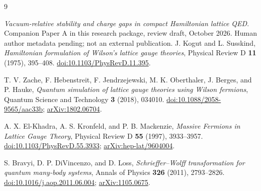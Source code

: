 
\begin{thebibliography}{9}
\raggedright
{}
\emph{Vacuum-relative stability and charge gaps in compact Hamiltonian lattice QED}.
Companion Paper A in this research package, review draft, October 2026.
Human author metadata pending; not an external publication.
J. Kogut and L. Susskind,
\emph{Hamiltonian formulation of Wilson's lattice gauge theories},
Physical Review D \textbf{11} (1975), 395--408.
\href{https://doi.org/10.1103/PhysRevD.11.395}{doi:10.1103/PhysRevD.11.395}.


T. V. Zache, F. Hebenstreit, F. Jendrzejewski, M. K. Oberthaler,
J. Berges, and P. Hauke,
\emph{Quantum simulation of lattice gauge theories using Wilson fermions},
Quantum Science and Technology \textbf{3} (2018), 034010.
\href{https://doi.org/10.1088/2058-9565/aac33b}{doi:10.1088/2058-9565/aac33b};
\href{https://arxiv.org/abs/1802.06704}{arXiv:1802.06704}.

A. X. El-Khadra, A. S. Kronfeld, and P. B. Mackenzie,
\emph{Massive Fermions in Lattice Gauge Theory},
Physical Review D \textbf{55} (1997), 3933--3957.
\href{https://doi.org/10.1103/PhysRevD.55.3933}{doi:10.1103/PhysRevD.55.3933};
\href{https://arxiv.org/abs/hep-lat/9604004}{arXiv:hep-lat/9604004}.


S. Bravyi, D. P. DiVincenzo, and D. Loss,
\emph{Schrieffer--Wolff transformation for quantum many-body systems},
Annals of Physics \textbf{326} (2011), 2793--2826.
\href{https://doi.org/10.1016/j.aop.2011.06.004}{doi:10.1016/j.aop.2011.06.004};
\href{https://arxiv.org/abs/1105.0675}{arXiv:1105.0675}.


\end{thebibliography}

